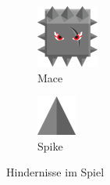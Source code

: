 \begin{figure}[H]
    \centering
    \begin{subfigure}[H]{0.15\textwidth}
        \includegraphics[width=\textwidth]{img/realisierung/assets/mace}
        \caption{Mace}
        \label{fig:mace}
    \end{subfigure}
    \qquad
    \begin{subfigure}[H]{0.15\textwidth}
        \includegraphics[width=\textwidth]{img/realisierung/assets/spike}
        \caption{Spike}
        \label{fig:spike}
    \end{subfigure}
    \caption{Hindernisse im Spiel}
    \label{fig:maceandspike}
\end{figure}

